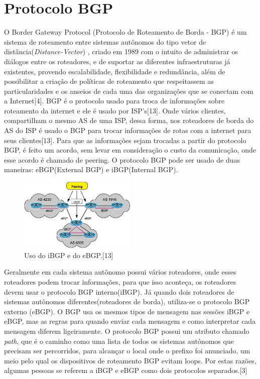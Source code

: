 \documentclass[12pt,a4paper]{report}
\begin{document}
\chapter{Protocolo BGP}
O Border Gateway Protocol (Protocolo de Roteamento de Borda - BGP) \'e um sistema de roteamento entre sistemas aut\^onomos do tipo vetor de dist\^ancia(\textit{Distance-Vector}) , criado em 1989 com o intuito de administrar os di\'alogos entre os roteadores, e de suportar as diferentes infraestruturas j\'a existentes, provendo escalabilidade, flexibilidade e redund\^ancia, al\'em de possibilitar a cria\c{c}\~ao de pol\'iticas de roteamento que respeitassem as particularidades e os anseios de cada uma das organiza\c{c}\~oes que se conectam com a Internet[4]. BGP \'e o protocolo usado para troca de informa\c{c}\~oes sobre roteamento da internet e ele \'e usado por ISP's[13]. Onde v\'arios clientes, compartilham o mesmo AS de uma ISP, dessa forma, nos roteadores de borda do AS do ISP \'e usado o BGP para trocar informa\c{c}\~oes de rotas com a internet para seus clientes[13]. Para que as informa\c{c}\~oes sejam trocadas a partir do protocolo BGP, \'e feito um acordo, sem levar em considera\c{c}\~ao o custo da comunica\c{c}\~ao, onde esse acordo \'e chamado de peering. O protocolo BGP pode ser usado de duas maneiras: eBGP(External BGP) e iBGP(Internal BGP).

\begin{figure}[!htb]
 \centering
 \includegraphics[width=0.5\textwidth]{Imagens/figura2BGP.jpg}
  \caption{\label{fig:figura2BGP}  Uso do iBGP e do eBGP.[13]}
\end{figure}

Geralmente em cada sistema aut\^onomo possui v\'arios roteadores, onde esses roteadores podem trocar informa\c{c}\~oes, para que isso aconte\c{c}a, os roteadores devem usar o protocolo BGP interno(iBGP). J\'a quando dois roteadores de sistemas aut\^onomos diferentes(roteadores de borda), utiliza-se o protocolo BGP externo (eBGP). O BGP usa os mesmos tipos de mensagem nas sess\~oes iBGP e eBGP, mas as regras para quando enviar cada mensagem e como interpretar cada mensagem diferem ligeiramente. O protocolo BGP possui um atributo chamado \textit{path}, que \'e o caminho como uma lista de todos os sistemas aut\^onomos que precisam ser percorridos, para alcan\c{c}ar o local onde o prefixo foi anunciado, um meio pelo qual os dispositivos de roteamento BGP evitam loops. Por estas raz\~oes, algumas pessoas se referem a iBGP e eBGP como dois protocolos separados.[3]
\end{document}
